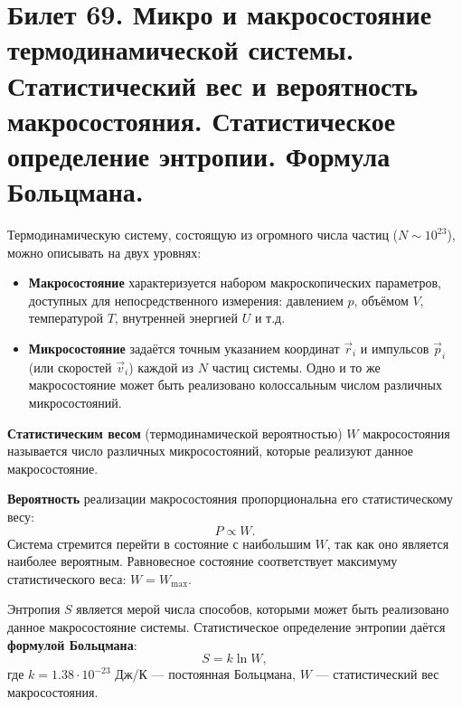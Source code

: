 \section{Билет 69. Микро и макросостояние термодинамической системы. Статистический вес и вероятность макросостояния. Статистическое определение энтропии. Формула Больцмана.}

\begin{definition}
Термодинамическую систему, состоящую из огромного числа частиц ($N \sim 10^{23}$), можно описывать на двух уровнях:
\begin{itemize}
    \item \textbf{Макросостояние} характеризуется набором макроскопических параметров, доступных для непосредственного измерения: давлением $p$, объёмом $V$, температурой $T$, внутренней энергией $U$ и т.д.
    \item \textbf{Микросостояние} задаётся точным указанием координат $\vec{r}_i$ и импульсов $\vec{p}_i$ (или скоростей $\vec{v}_i$) каждой из $N$ частиц системы. Одно и то же макросостояние может быть реализовано колоссальным числом различных микросостояний.
\end{itemize}
\end{definition}

\begin{definition}
\textbf{Статистическим весом} (термодинамической вероятностью) $W$ макросостояния называется число различных микросостояний, которые реализуют данное макросостояние.
\par\noindent\textbf{Вероятность} реализации макросостояния пропорциональна его статистическому весу:
\begin{equation}
    P \propto W.
\end{equation}
Система стремится перейти в состояние с наибольшим $W$, так как оно является наиболее вероятным. Равновесное состояние соответствует максимуму статистического веса: $W = W_{\max}$.
\end{definition}

\begin{theorem}
Энтропия $S$ является мерой числа способов, которыми может быть реализовано данное макросостояние системы. Статистическое определение энтропии даётся \textbf{формулой Больцмана}:
\begin{equation}
    S = k \ln W, \label{eq:boltzmann_entropy_69}
\end{equation}
где $k = 1.38 \cdot 10^{-23}$ Дж/К --- постоянная Больцмана, $W$ --- статистический вес макросостояния.
\end{theorem}

